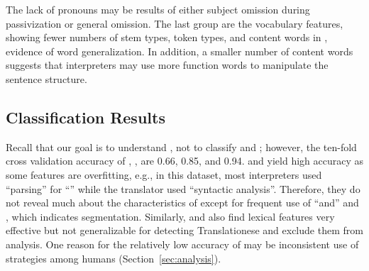 The lack of pronouns may be results of either subject omission during
passivization or general omission.  The last group are the vocabulary features,
showing fewer numbers of stem types, token types, and content words in \inter{},
evidence of word generalization.  In addition, a smaller number of content words
suggests that interpreters may use more function words to manipulate the sentence
structure.

\subsection{Classification Results}














Recall that our goal is to understand \inter{}, not to classify
\inter{} and \trans{}; however, the ten-fold cross validation accuracy
of , ,  are 0.66, 0.85, and 0.94.
 and  yield high accuracy as some features are
overfitting, e.g., in this dataset, most interpreters used ``parsing''
for ``'' while the translator used ``syntactic
analysis''.  Therefore, they do not reveal much about the
characteristics of \inter{} except for frequent use of ``and'' and
, which indicates segmentation.  Similarly,
 and  also find
lexical features very effective but not generalizable for detecting
Translationese and exclude them from analysis.  One reason for the
relatively low accuracy of  may be inconsistent use of
strategies among humans (Section~\ref{sec:analysis}).

